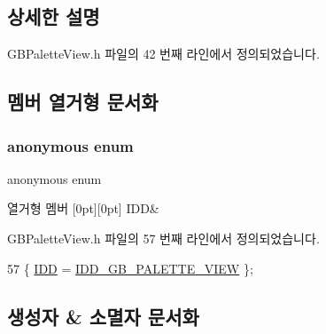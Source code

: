 \subsection{상세한 설명}


G\+B\+Palette\+View.\+h 파일의 42 번째 라인에서 정의되었습니다.



\subsection{멤버 열거형 문서화}
\mbox{\label{class_g_b_palette_view_a523298d9315ba49a30c3982b035329fb}} 
\subsubsection{\texorpdfstring{anonymous enum}{anonymous enum}}
{\footnotesize\ttfamily anonymous enum}

\begin{DoxyEnumFields}{열거형 멤버}
[0pt][0pt]{}\mbox{\label{class_g_b_palette_view_a523298d9315ba49a30c3982b035329fba31059a608a51ee0b70c6cf968a4ec9ed}} 
I\+DD&\\
\hline

\end{DoxyEnumFields}


G\+B\+Palette\+View.\+h 파일의 57 번째 라인에서 정의되었습니다.


\begin{DoxyCode}
57 \{ \mbox{\hyperlink{class_g_b_palette_view_a523298d9315ba49a30c3982b035329fba31059a608a51ee0b70c6cf968a4ec9ed}{IDD}} = \mbox{\hyperlink{resource_8h_aa816696d6cfad8adb7de1dc52637b173}{IDD\_GB\_PALETTE\_VIEW}} \};
\end{DoxyCode}


\subsection{생성자 \& 소멸자 문서화}
\mbox{\label{class_g_b_palette_view_a2e6568baf28747b9f2f0169cbbaf6e20}} 
